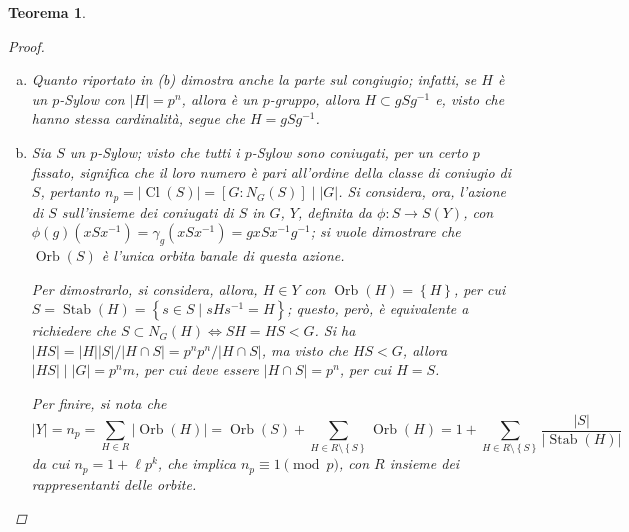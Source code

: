 \documentclass[12pt]{scrartcl}
\theoremstyle{style}
\newtheorem{teorema}{Teorema}[section]
\numberwithin{equation}{subsection}
\begin{document}
\begin{teorema}
\begin{proof}
\begin{enumerate}[(a).]
				Si considera l'azione di $H$ su $G / S = X$ definita da
				\[
					\varphi : 
					\begin{array}
						{c c c}
						H &\longrightarrow & S(X)\\
						h&\longmapsto & \varphi _h
					\end{array}, \text{ con } \varphi _h(gS) = hgS
				\] 
				Per la formula delle classi:
				\[
				m = \lvert X \rvert = \sum_{g \in R}^{} \lvert \operatorname{Orb} (g S) \rvert = \sum_{g \in R}^{} \frac{\lvert H \rvert }{\lvert \operatorname{Stab} (gS) \rvert } = \sum_{g \in R}^{} p^{a _g} 
				\] 
				dove $R$ \`e l'insieme dei rappresentanti delle classi di $G/S$ e $a_g$ \`e un esponente dipendente dal $g$ in $R$.
				Visto che $p  \nmid m $\footnote{Questo \`e per assunzione, cio\`e $\lvert G \rvert =p^n m $ con $(p,m) = 1$.}, deve esistere un $g \in R$ tale che $a_g=0$, per cui $\operatorname{Orb} (gS) = \left\{ gS \right\} \Rightarrow \operatorname{Stab} (gS) = H$.
				Questo significa anche che $\forall h\in H, \ hgS = gS \Rightarrow H \subset gSg^{-1}$, ma $gSg^{-1}$ \`e un $p$-Sylow perch\'e $\lvert gSg^{-1} \rvert = \lvert S \rvert $, quindi $H$ \`e contenuto in un $p$-Sylow.
			\item Quanto riportato in (b) dimostra anche la parte sul congiugio; infatti, se $H$ \`e un $p$-Sylow con $\lvert H\rvert = p^n$, allora \`e un $p$-gruppo, allora $H \subset gSg^{-1}$ e, visto che hanno stessa cardinalit\`a, segue che $H = g S g^{-1}$.
			\item Sia $S$ un $p$-Sylow; visto che tutti i $p$-Sylow sono coniugati, per un certo $p$ fissato, significa che il loro numero \`e pari all'ordine della classe di coniugio di $S$, pertanto $n_p = \lvert \operatorname{Cl} (S) \rvert  = [G:N_G(S)]  \mid  |G|$.
				Si considera, ora, l'azione di $S$ sull'insieme dei coniugati di $S$ in $G$, $Y$, definita da $\phi :S \to S(Y)$, con $\phi (g)(xSx^{-1}) = \gamma_g (xSx^{-1}) = gxSx^{-1}g^{-1}$; si vuole dimostrare che $\operatorname{Orb} (S)$ \`e l'unica orbita banale di questa azione.

				Per dimostrarlo, si considera, allora, $H \in Y$ con $\operatorname{Orb} (H) = \left\{ H \right\} $, per cui $S = \operatorname{Stab}(H) = \left\{ s \in S  \mid s H s^{-1} = H\right\}  $; questo, per\`o, \`e equivalente a richiedere che $S \subset  N_G(H) \iff SH = HS < G$.
				Si ha $\lvert HS \rvert = \lvert H \rvert \lvert S \rvert  / \lvert H \cap S \rvert = p^np^n / \lvert H\cap S \rvert $, ma visto che $HS < G$, allora $\lvert HS \rvert  \mid |G| = p^nm$, per cui deve essere $\lvert H\cap S \rvert =p^n$, per cui $H = S$.

				Per finire, si nota che
				\[
				\lvert Y \rvert =n_p = \sum_{H \in R}^{} \lvert \operatorname{Orb} (H) \rvert = \operatorname{Orb} (S) + \sum_{H \in R \setminus\left\{ S \right\} }^{} \operatorname{Orb} (H) = 1 + \sum_{H \in R \setminus\left\{ S \right\} }^{} \frac{\lvert S \rvert }{\lvert \operatorname{Stab} (H) \rvert }
				\] 
				da cui $n_p = 1 + \ell p^k$, che implica $n_p \equiv 1 \pmod{p} $, con $R$ insieme dei rappresentanti delle orbite.
		\end{enumerate}
	\end{proof}
\end{teorema}
\end{document}
